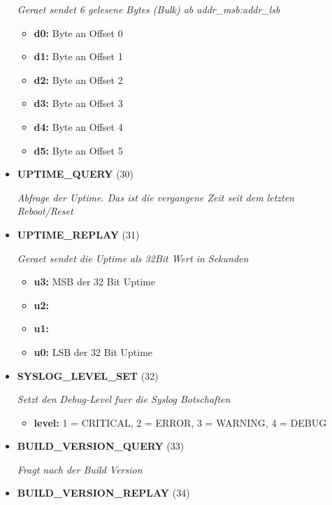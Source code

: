 \begin{itemize}
\textit{Geraet sendet 6 gelesene Bytes (Bulk) ab addr\_msb:addr\_lsb}

\small
\begin{itemize}
		
\item \textbf{d0:} Byte an Offset 0
\item \textbf{d1:} Byte an Offset 1
\item \textbf{d2:} Byte an Offset 2
\item \textbf{d3:} Byte an Offset 3
\item \textbf{d4:} Byte an Offset 4
\item \textbf{d5:} Byte an Offset 5
\end{itemize}
\normalsize
	
\item \textbf{UPTIME\_QUERY} (30)

\textit{Abfrage der Uptime. Das ist die vergangene Zeit seit dem letzten Reboot/Reset}

\item \textbf{UPTIME\_REPLAY} (31)

\textit{Geraet sendet die Uptime als 32Bit Wert in Sekunden}

\small
\begin{itemize}
		
\item \textbf{u3:} MSB der 32 Bit Uptime
\item \textbf{u2:} 
\item \textbf{u1:} 
\item \textbf{u0:} LSB der 32 Bit Uptime
\end{itemize}
\normalsize
	
\item \textbf{SYSLOG\_LEVEL\_SET} (32)

\textit{Setzt den Debug-Level fuer die Syslog Botschaften}

\small
\begin{itemize}
		
\item \textbf{level:}  1 = CRITICAL, 2 = ERROR, 3 = WARNING, 4 = DEBUG 
\end{itemize}
\normalsize
	
\item \textbf{BUILD\_VERSION\_QUERY} (33)

\textit{Fragt nach der Build Version}

\item \textbf{BUILD\_VERSION\_REPLAY} (34)


\end{itemize}
